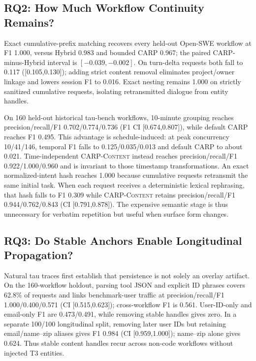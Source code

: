 \documentclass[letterpaper]{article}
\newcommand{\carp}{\textsc{CARP}\xspace}
\newcommand{\carpcontent}{\textsc{CARP-Content}\xspace}
\begin{document}
\subsection{RQ2: How Much Workflow Continuity Remains?}

Exact cumulative-prefix matching recovers every held-out Open-SWE workflow at F1 1.000, versus
Hybrid 0.983 and bounded \carp 0.967; the paired \carp-minus-Hybrid interval is
$[-0.039,-0.002]$. On turn-delta requests both fall to 0.117 ([0.105,0.130]); adding strict content
removal eliminates project/owner linkage and lowers session F1 to 0.016. Exact nesting remains
1.000 on strictly sanitized cumulative requests, isolating retransmitted dialogue from entity handles.

On 160 held-out historical tau-bench workflows, 10-minute grouping reaches
precision/recall/F1 0.702/0.774/0.736 (F1 CI [0.674,0.807]), while default \carp reaches F1 0.495.
This advantage is schedule-induced: at peak concurrency 10/41/146, temporal F1 falls to
0.125/0.035/0.013 and default \carp to about 0.021. Time-independent \carpcontent instead reaches
precision/recall/F1 0.922/1.000/0.960 and is invariant to those timestamp transformations. An exact
normalized-intent hash reaches 1.000 because cumulative requests retransmit the same initial task.
When each request receives a deterministic lexical rephrasing, that hash falls to F1 0.309 while
\carpcontent retains precision/recall/F1 0.944/0.762/0.843 (CI [0.791,0.878]). The expensive semantic stage is thus
unnecessary for verbatim repetition but useful when surface form changes.

\subsection{RQ3: Do Stable Anchors Enable Longitudinal Propagation?}

Natural tau traces first establish that persistence is not solely an overlay artifact. On the
160-workflow holdout,
parsing tool JSON and explicit ID phrases covers 62.8\% of requests and links benchmark-user traffic
at precision/recall/F1 1.000/0.400/0.571 (CI [0.515,0.623]); cross-workflow F1 is 0.561.
User-ID-only and email-only F1 are 0.473/0.491, while removing stable handles gives zero. In a
separate 100/100 longitudinal split, removing later user IDs but retaining email/name--zip aliases
gives F1 0.984 (CI [0.959,1.000]); name--zip alone gives 0.624. Thus stable content handles recur
across non-code workflows without injected T3 entities.
\end{document}
